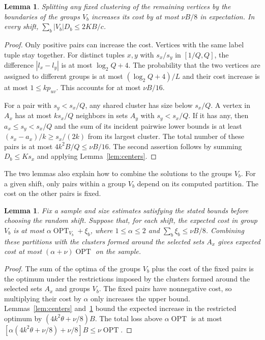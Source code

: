 \documentclass[11pt]{article}
\newtheorem{lemma}[theorem]{Lemma}
\newcommand{\OPT}{\operatorname{OPT}}
\begin{document}
\begin{lemma}\label{lem:band-cuts}
Splitting any fixed clustering of the remaining vertices by the
boundaries of the groups $V_b$ increases its cost by at most $\nu B/8$
in expectation. In every shift, $\sum_b |V_b|D_b\le 2KB/c$.
\end{lemma}
\begin{proof}
Only positive pairs can increase the cost. Vertices with the same label tuple stay
together. For distinct tuples $x,y$ with $s_x/s_y$ in $[1/Q,Q]$, the difference
$|l_x-l_y|$ is at most $\log_2 Q+4$. The probability that the two vertices are assigned
to different groups
is at most $(\log_2 Q+4)/L$ and their cost increase is at most
$1\le k p_{uv}$. This accounts for at most $\nu B/16$.

For a pair with $s_y<s_x/Q$, any shared cluster has size below $s_x/Q$.
A vertex in $A_x$ has at most $k s_x/Q$ neighbors
in sets $A_y$ with $s_y<s_x/Q$. If it has any, then $a_x\le s_y<s_x/Q$ and
the sum of its incident pairwise lower bounds is at least $(s_x-a_x)/k\ge s_x/(2k)$ from
its largest cluster. The total number of these pairs is at most
$4k^2B/Q\le\nu B/16$. The second assertion follows by summing
$D_b\le K s_x$ and applying Lemma~\ref{lem:centers}.
\end{proof}

The two lemmas also explain how to combine the solutions to the groups $V_b$.
For a given shift, only pairs within a group $V_b$ depend on its computed
partition. The cost on the other pairs is fixed.

\begin{lemma}\label{lem:combine-bands}
Fix a sample and size estimates satisfying the stated bounds before choosing the random shift.
Suppose that, for each shift, the expected cost in group $V_b$ is at most
$\alpha\OPT_{V_b}+\xi_b$, where $1\le\alpha\le2$ and
$\sum_b\xi_b\le\nu B/8$. Combining these partitions with the clusters formed around the selected sets $A_x$ gives expected cost at most $(\alpha+\nu)\OPT$ on the sample.
\end{lemma}
\begin{proof}
The sum of the optima of the groups $V_b$ plus the cost of the fixed pairs is the
optimum under the restrictions imposed by the clusters formed around the selected sets
$A_x$ and groups $V_b$. The fixed pairs have
nonnegative cost, so multiplying their cost by $\alpha$ only increases
the upper bound. Lemmas~\ref{lem:centers} and~\ref{lem:band-cuts}
bound the expected increase in the restricted optimum by
$(4k^2\theta+\nu/8)B$. The total loss above $\alpha\OPT$ is at most
$[\alpha(4k^2\theta+\nu/8)+\nu/8]B\le\nu\OPT$.
\end{proof}
\end{document}
